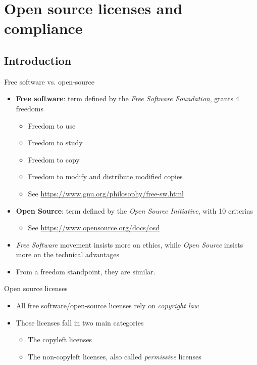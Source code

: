 \section{Open source licenses and compliance}

\subsection{Introduction}

\begin{frame}{Free software vs. open-source}
  \begin{itemize}
  \item {\bf Free software}: term defined by the {\em Free Software
      Foundation}, grants 4 freedoms
    \begin{itemize}
    \item Freedom to use
    \item Freedom to study
    \item Freedom to copy
    \item Freedom to modify and distribute modified copies
    \item See \url{https://www.gnu.org/philosophy/free-sw.html}
    \end{itemize}
  \item {\bf Open Source}: term defined by the {\em Open Source
      Initiative}, with 10 criterias
    \begin{itemize}
    \item See \url{https://www.opensource.org/docs/osd}
    \end{itemize}
  \item {\em Free Software} movement insists more on ethics, while
    {\em Open Source} insists more on the technical advantages
  \item From a freedom standpoint, they are similar.
  \end{itemize}
\end{frame}

\begin{frame}{Open source licenses}
  \begin{itemize}
  \item All free software/open-source licenses rely on {\em
      copyright law}
  \item Those licenses fall in two main categories
    \begin{itemize}
    \item The copyleft licenses
    \item The non-copyleft licenses, also called {\em permissive}
      licenses
    \end{itemize}
  \end{itemize}
\end{frame}


